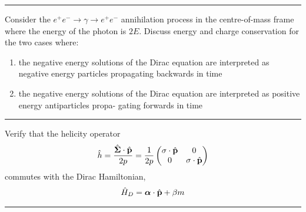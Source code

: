 \noindent\rule{7in}{1.5pt}


\begin{problem}{4.11}
Consider the $e^+e^-\to\gamma\to e^+e^-$ annihilation process in the centre-of-mass frame where the energy of the photon is $2E$.
Discuss energy and charge conservation for the two cases where:
\begin{enumerate}[label=(\alph*)]
    \item the negative energy solutions of the Dirac equation are interpreted as negative energy particles propagating backwards in time
    \item the negative energy solutions of the Dirac equation are interpreted as positive energy antiparticles propa- gating forwards in time
\end{enumerate}
\end{problem}
\begin{solution}

\end{solution}

\noindent\rule{7in}{1.5pt}


\begin{problem}{4.12}
Verify that the helicity operator
\begin{align*}
    \hat{h} = \frac{\hat{\boldsymbol{\Sigma}}\cdot\hat{\mathbf{p}}}{2p} = \frac{1}{2p}
    \begin{pmatrix}
        \boldmath{\sigma}\cdot\hat{\mathbf{p}} & 0 \\
        0 & \boldmath{\sigma}\cdot\hat{\mathbf{p}}
    \end{pmatrix}
\end{align*}
commutes with the Dirac Hamiltonian,
\begin{align*}
    \hat{H}_D = \boldsymbol{\alpha}\cdot\hat{\mathbf{p}} + \beta m
\end{align*}
\end{problem}
\begin{solution}

\end{solution}

\noindent\rule{7in}{1.5pt}



